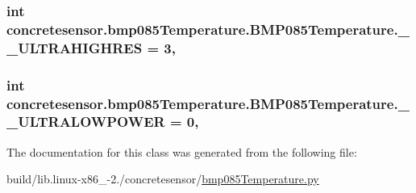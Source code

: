 \subsubsection[{\+\_\+\+\_\+\+U\+L\+T\+R\+A\+H\+I\+G\+H\+R\+E\+S}]{\setlength{\rightskip}{0pt plus 5cm}int concretesensor.\+bmp085\+Temperature.\+B\+M\+P085\+Temperature.\+\_\+\+\_\+\+U\+L\+T\+R\+A\+H\+I\+G\+H\+R\+E\+S = 3\hspace{0.3cm}{\ttfamily [static]}, {\ttfamily [private]}}\label{classconcretesensor_1_1bmp085Temperature_1_1BMP085Temperature_ace6189a14662c286718709d1d701bfb3}
\hypertarget{classconcretesensor_1_1bmp085Temperature_1_1BMP085Temperature_af8fc53dcdafeb8e184d778075f230ac8}{}
\subsubsection[{\+\_\+\+\_\+\+U\+L\+T\+R\+A\+L\+O\+W\+P\+O\+W\+E\+R}]{\setlength{\rightskip}{0pt plus 5cm}int concretesensor.\+bmp085\+Temperature.\+B\+M\+P085\+Temperature.\+\_\+\+\_\+\+U\+L\+T\+R\+A\+L\+O\+W\+P\+O\+W\+E\+R = 0\hspace{0.3cm}{\ttfamily [static]}, {\ttfamily [private]}}\label{classconcretesensor_1_1bmp085Temperature_1_1BMP085Temperature_af8fc53dcdafeb8e184d778075f230ac8}


The documentation for this class was generated from the following file\+:\begin{DoxyCompactItemize}
\item 
build/lib.\+linux-\/x86\+\_-\/2./concretesensor/\hyperlink{build_2lib_8linux-x86__64-2_87_2concretesensor_2bmp085Temperature_8py}{bmp085\+Temperature.\+py}\end{DoxyCompactItemize}
